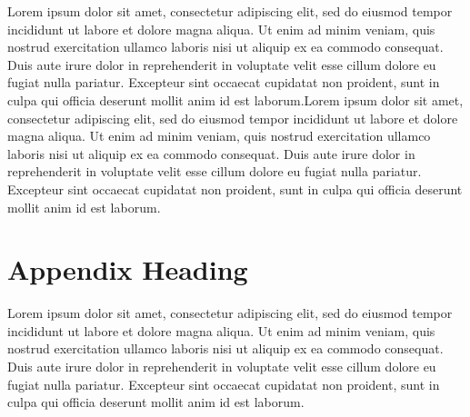 \documentclass[a4paper]{article}
\begin{document}
Lorem ipsum dolor sit amet, consectetur adipiscing elit, sed do eiusmod tempor incididunt ut labore et dolore magna aliqua. Ut enim ad minim veniam, quis nostrud exercitation ullamco laboris nisi ut aliquip ex ea commodo consequat. Duis aute irure dolor in reprehenderit in voluptate velit esse cillum dolore eu fugiat nulla pariatur. Excepteur sint occaecat cupidatat non proident, sunt in culpa qui officia deserunt mollit anim id est laborum.Lorem ipsum dolor sit amet, consectetur adipiscing elit, sed do eiusmod tempor incididunt ut labore et dolore magna aliqua. Ut enim ad minim veniam, quis nostrud exercitation ullamco laboris nisi ut aliquip ex ea commodo consequat. Duis aute irure dolor in reprehenderit in voluptate velit esse cillum dolore eu fugiat nulla pariatur. Excepteur sint occaecat cupidatat non proident, sunt in culpa qui officia deserunt mollit anim id est laborum.






\clearpage
\nocite{*}



\appendix
\chapter{Appendix Heading}

Lorem ipsum dolor sit amet, consectetur adipiscing elit, sed do eiusmod tempor incididunt ut labore et dolore magna aliqua. Ut enim ad minim veniam, quis nostrud exercitation ullamco laboris nisi ut aliquip ex ea commodo consequat. Duis aute irure dolor in reprehenderit in voluptate velit esse cillum dolore eu fugiat nulla pariatur. Excepteur sint occaecat cupidatat non proident, sunt in culpa qui officia deserunt mollit anim id est laborum.
\end{document}
